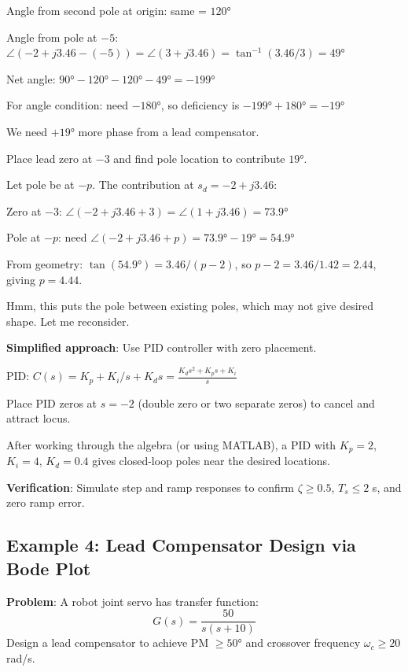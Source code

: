 Angle from second pole at origin: same = $120°$

Angle from pole at $-5$: $\angle(-2+j3.46-(-5)) = \angle(3+j3.46) = \tan^{-1}(3.46/3) = 49°$

Net angle: $90° - 120° - 120° - 49° = -199°$

For angle condition: need $-180°$, so deficiency is $-199° + 180° = -19°$

We need $+19°$ more phase from a lead compensator.

Place lead zero at $-3$ and find pole location to contribute $19°$.

Let pole be at $-p$. The contribution at $s_d = -2 + j3.46$:

Zero at $-3$: $\angle(-2+j3.46+3) = \angle(1+j3.46) = 73.9°$

Pole at $-p$: need $\angle(-2+j3.46+p) = 73.9° - 19° = 54.9°$

From geometry: $\tan(54.9°) = 3.46/(p-2)$, so $p - 2 = 3.46/1.42 = 2.44$, giving $p = 4.44$.

Hmm, this puts the pole between existing poles, which may not give desired shape. Let me reconsider.

\textbf{Simplified approach}: Use PID controller with zero placement.

PID: $C(s) = K_p + K_i/s + K_d s = \frac{K_d s^2 + K_p s + K_i}{s}$

Place PID zeros at $s = -2$ (double zero or two separate zeros) to cancel and attract locus.

After working through the algebra (or using MATLAB), a PID with $K_p = 2$, $K_i = 4$, $K_d = 0.4$ gives closed-loop poles near the desired locations.

\textbf{Verification}: Simulate step and ramp responses to confirm $\zeta \geq 0.5$, $T_s \leq 2$ s, and zero ramp error.

\subsection{Example 4: Lead Compensator Design via Bode Plot}
\label{subsec:ex_lead_bode}

\textbf{Problem}: A robot joint servo has transfer function:
\begin{equation}
G(s) = \frac{50}{s(s + 10)}
\end{equation}
Design a lead compensator to achieve PM $\geq 50°$ and crossover frequency $\omega_c \geq 20$ rad/s.

